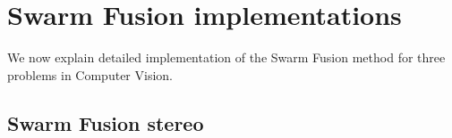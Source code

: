 \section{Swarm Fusion implementations}
We now explain detailed implementation of the Swarm Fusion method for
three problems in Computer Vision.

\subsection{Swarm Fusion stereo}
